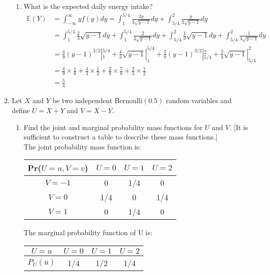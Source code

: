 \documentclass[11pt]{article}
\begin{document}
\begin{enumerate}[label=\textbf{Question \arabic*:},start=1]
\begin{enumerate}
	\item What is the expected daily energy intake?\\
	\begin{align*}
	\mathbb{E}(Y) & = \int_{-\infty}^{\infty} y f(y) dy = \int_{1}^{5/4} \frac{2y}{3\sqrt{y-1}} dy+ \int_{5/4}^{2} \frac{y}{3\sqrt{y-1}} dy\\
	 & = \int_{1}^{5/4} \frac{2}{3} \sqrt{y-1}dy + \int_{1}^{5/4} \frac{2}{3\sqrt{y-1}}dy + \int_{5/4}^{2} \frac{1}{3} \sqrt{y-1}dy + \int_{5/4}^{2} \frac{1}{3\sqrt{y-1}} dy \\
	 & = \frac{4}{9} (y-1)^{3/2} |_{1}^{5/4} + \frac{4}{3} \sqrt{y-1} |_{1}^{5/4} + \frac{2}{9} (y-1)^{3/2} |_{5/4}^{2} + \frac{2}{3} \sqrt{y-1} |_{5/4}^{2}  \\
	 & = \frac{4}{9} \times \frac{1}{8} + \frac{4}{3} \times \frac{1}{2} + \frac{2}{9} \times \frac{7}{8}  + \frac{2}{3} \times \frac{1}{2} \\
	 &= \frac{5}{4}
	\end{align*}
	
\end{enumerate}





\item Let $X$ and $Y$ be two independent Bernoulli$(0.5)$ random variables and define $U = X + Y$ and $V = X - Y$. 
\begin{enumerate}
	\item Find the joint and marginal probability mass functions for $U$ and $V$. [It is sufficient to construct a table to describe these mass functions.]\\
	
	The joint probability mass function is:
\begin{center}
 \begin{tabular}{|| c c c c ||} 
 \hline
 Pr($U=u, V= v$) & $U=0$ & $U=1$ & $U=2$ \\ [0.5ex] 
 \hline\hline
 $V=-1$ & 0 & 1/4 & 0  \\ 
 \hline
 $V=0$ & 1/4 & 0 & 1/4  \\
 \hline
 $V=1$ & 0 & 1/4 & 0 \\
 \hline
\end{tabular}
\end{center}

	The marginal probability function of U is:
\begin{center}
 \begin{tabular}{|| c c c c ||} 
 \hline
 $U=u$ & $U=0$ & $U=1$ & $U=2$ \\ [0.5ex] 
 \hline\hline
 $P_{U}(u)$ & 1/4 & 1/2 & 1/4  \\ 
 \hline
\end{tabular}
\end{center}


\end{enumerate}
\end{enumerate}
\end{document}
